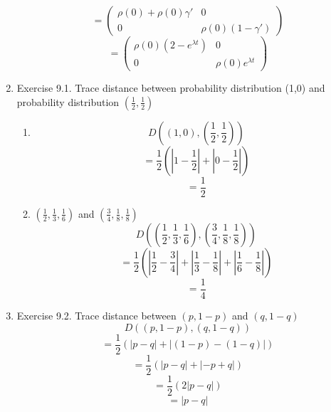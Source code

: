 \documentclass[12pt]{article}
\begin{document}
\begin{enumerate}
    $$ = \left(\begin{array}{cc} \rho (0) + \rho(0)\gamma'  & 0 \\  0& \rho (0) ( 1-\gamma') \end{array}\right) $$
    $$ = \left(\begin{array}{cc} \rho (0) ( 2-e^{\lambda t}) & 0 \\  0& \rho (0) e^{\lambda t} \end{array}\right) $$

    \item Exercise 9.1. Trace distance between probability distribution (1,0) and probability distribution $(\frac{1}{2}, \frac{1}{2})$
    \begin{enumerate}
        \item $$ D((1,0), (\frac{1}{2}, \frac{1}{2})) $$
        $$ = \frac{1}{2} ( |1-\frac{1}{2} | + | 0 - \frac{1}{2} | ) $$
        $$ = \frac{1}{2} $$

        \item $(\frac{1}{2}, \frac{1}{3}, \frac{1}{6}) $ and $(\frac{3}{4}, \frac{1}{8}, \frac{1}{8})$ 
        $$ D((\frac{1}{2}, \frac{1}{3}, \frac{1}{6}), (\frac{3}{4}, \frac{1}{8}, \frac{1}{8})) $$
        $$ = \frac{1}{2} ( | \frac{1}{2} - \frac{3}{4}| + |\frac{1}{3} - \frac{1}{8}| + |\frac{1}{6} - \frac{1}{8}|) $$
        $$ = \frac{1}{4} $$


    \end{enumerate}
    \item Exercise 9.2. Trace distance between $(p,1-p)$ and $(q, 1-q)$ 
    $$ D((p,1-p), (q,1-q)) $$
    $$ = \frac{1}{2} ( |p-q| + |(1-p)-(1-q)| ) $$
    $$ = \frac{1}{2} ( |p-q| + |-p +q| ) $$
    $$ = \frac{1}{2} (2 |p-q|) $$
    $$ = |p-q| $$



\end{enumerate}
\end{document}
